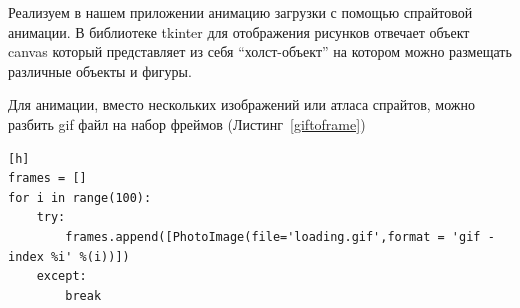 \documentclass[a4paper]{article}
\begin{document}
\begin{figure}[h]
\end{figure}

Реализуем в нашем приложении анимацию загрузки с помощью  спрайтовой анимации. В библиотеке tkinter для отображения рисунков отвечает объект canvas который представляет из себя ``холст-объект'' на котором можно размещать различные объекты и фигуры.

Для анимации, вместо нескольких изображений или атласа спрайтов, можно разбить gif файл на набор фреймов (Листинг~\ref{giftoframe})

\newpage
\begin{lstlisting}[label=giftoframe,caption=Выборка данных][h]
frames = []
for i in range(100):
    try:
        frames.append([PhotoImage(file='loading.gif',format = 'gif -index %i' %(i))])
    except:
        break
\end{lstlisting}
\end{document}
